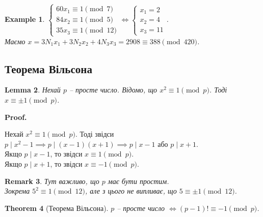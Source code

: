 \documentclass[a4paper, 14pt]{extarticle}
\makeatletter
\theoremstyle{theoremdd}
\newtheorem{theorem}{Theorem}[subsection]
\theoremstyle{theoremdd}
\theoremstyle{theoremdd}
\theoremstyle{theoremdd}
\newtheorem{example}[theorem]{Example}
\theoremstyle{theoremdd}
\theoremstyle{theoremdd}
\newtheorem{remark}[theorem]{Remark}
\theoremstyle{theoremdd}
\newtheorem{lemma}[theorem]{Lemma}
\theoremstyle{theoremdd}
\def\qed{$\blacksquare$}
\renewenvironment{proof}[1][Proof.\\]{\par
\pushQED{\hfill \qed}%
\normalfont \topsep6\p@\@plus6\p@\relax
\trivlist
\item\relax
{\bfseries
#1\@addpunct{.}}\hspace\labelsep\ignorespaces
}{%
\popQED\endtrivlist\@endpefalse
}
\makeatother
\begin{document}
\begin{example}
$\begin{cases}
60x_1 \equiv 1 \pmod 7 \\
84x_2 \equiv 1 \pmod 5 \\
35x_3 \equiv 1 \pmod {12}
\end{cases} \iff \begin{cases}
x_1 = 2 \\
x_2 = 4 \\
x_3 = 11
\end{cases}$.\\
Маємо $x = 3N_1x_1 + 3N_2x_2 + 4N_3x_3 = 2908 \equiv 388 \pmod {420}$.
\end{example}


\subsection{Теорема Вільсона}
\begin{lemma}
Нехай $p$ -- просте число. Відомо, що $x^2 \equiv 1 \pmod p$. Тоді $x \equiv \pm 1 \pmod p$.
\end{lemma}

\begin{proof}
Нехай $x^2 \equiv 1 \pmod p$. Тоді звідси $p \mid x^2 - 1 \implies p \mid (x-1)(x+1) \implies p \mid x-1$ або $p \mid x+1$.\\
Якщо $p \mid x-1$, то звідси $x \equiv 1 \pmod p$.\\
Якщо $p \mid x+1$, то звідси $x \equiv -1 \pmod p$.
\end{proof}

\begin{remark}
Тут важливо, що $p$ має бути простим.\\
Зокрема $5^2 \equiv 1 \pmod {12}$, але з цього не випливає, що $5 \equiv \pm 1 \pmod {12}$.
\end{remark}

\begin{theorem}[Теорема Вільсона]
$p$ -- просте число $\iff (p-1)! \equiv -1 \pmod p$.
\end{theorem}
\end{document}

